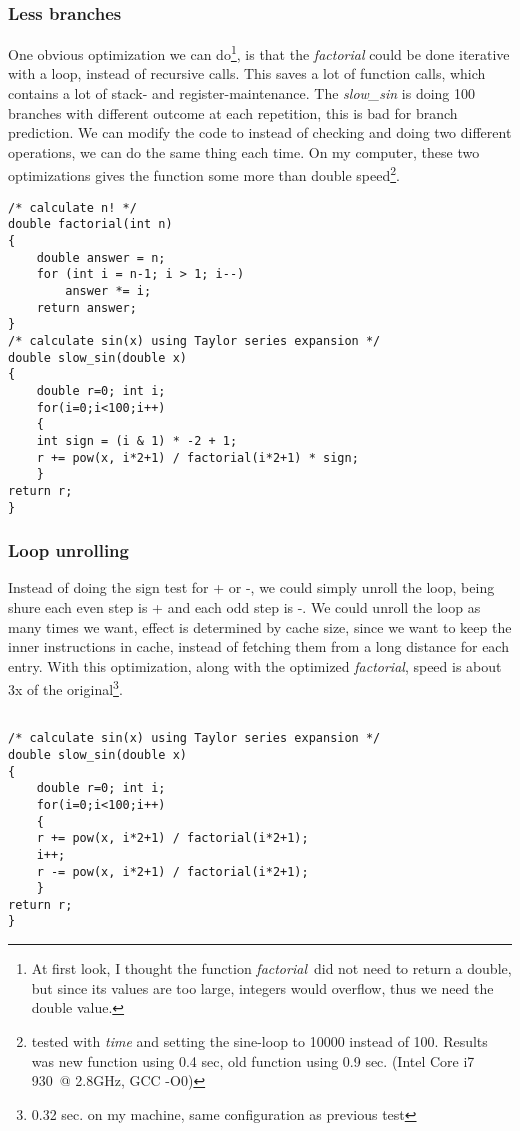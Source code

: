 \documentclass[english,a4paper,numbers=noenddot]{scrartcl}
\begin{document}
\subsubsection{Less branches}
One obvious optimization we can do\footnote{At first look, I thought the function \emph{factorial} did not need to return a double, but since its values are too large, integers would overflow, thus we need the double value.
}, is that the \emph{factorial} could be done iterative with a loop, instead of recursive calls. This saves
a lot of function calls, which contains a lot of stack- and register-maintenance. The \emph{slow\_sin} is doing 100 branches with different
outcome at each repetition, this is bad for branch prediction. We can modify the code to instead of checking and doing two different operations,
we can do the same thing each time. On my computer, these two optimizations gives the function
some more than double speed\footnote{tested with \emph{time} and setting the sine-loop
to 10000 instead of 100. Results was new function using 0.4 sec, old function using 0.9 sec. (Intel Core i7 930 @ 2.8GHz, GCC -O0)}.

\begin{lstlisting}
/* calculate n! */
double factorial(int n)
{
    double answer = n;
    for (int i = n-1; i > 1; i--)
        answer *= i;
    return answer;
}
/* calculate sin(x) using Taylor series expansion */
double slow_sin(double x)
{
    double r=0; int i;
    for(i=0;i<100;i++)
    {
	int sign = (i & 1) * -2 + 1;
	r += pow(x, i*2+1) / factorial(i*2+1) * sign;
    }
return r;
}
\end{lstlisting}

\subsubsection{Loop unrolling}

Instead of doing the sign test for + or -, we could simply unroll the loop, being shure each even step is + and each odd step is -.
We could unroll the loop as many times we want, effect is determined by cache size, since we want to keep the inner instructions in
cache, instead of fetching them from a long distance for each entry. With this optimization, along with the optimized \emph{factorial}, speed is about 3x of the original\footnote{0.32 sec. on my machine, same configuration as
previous test}.

\begin{lstlisting}

/* calculate sin(x) using Taylor series expansion */
double slow_sin(double x)
{
    double r=0; int i;
    for(i=0;i<100;i++)
    {
	r += pow(x, i*2+1) / factorial(i*2+1);
	i++;
	r -= pow(x, i*2+1) / factorial(i*2+1);
    }
return r;
}
\end{lstlisting}
\end{document}
